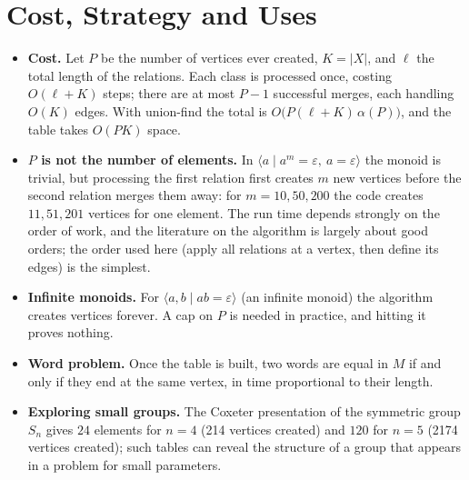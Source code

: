 \documentclass[11pt]{article}
\begin{document}
\section{Cost, Strategy and Uses}
\begin{itemize}[leftmargin=1.5em]
  \item \textbf{Cost.} Let $P$ be the number of vertices ever created, $K=|X|$, and $\ell$ the total length of the relations. Each class is processed once, costing $O(\ell+K)$ steps; there are at most $P-1$ successful merges, each handling $O(K)$ edges.
        With union-find the total is $O\bigl(P(\ell+K)\,\alpha(P)\bigr)$, and the table takes $O(PK)$ space.
  \item \textbf{$P$ is not the number of elements.} In $\langle a\mid a^m=\varepsilon,\ a=\varepsilon\rangle$ the monoid is trivial, but processing the first relation first creates $m$ new vertices before the second relation merges them away: for $m=10,50,200$ the code creates $11,51,201$ vertices for one element.
        The run time depends strongly on the order of work, and the literature on the algorithm is largely about good orders; the order used here (apply all relations at a vertex, then define its edges) is the simplest.
  \item \textbf{Infinite monoids.} For $\langle a,b\mid ab=\varepsilon\rangle$ (an infinite monoid) the algorithm creates vertices forever. A cap on $P$ is needed in practice, and hitting it proves nothing.
  \item \textbf{Word problem.} Once the table is built, two words are equal in $M$ if and only if they end at the same vertex, in time proportional to their length.
  \item \textbf{Exploring small groups.} The Coxeter presentation of the symmetric group $S_n$ gives $24$ elements for $n=4$ (214 vertices created) and $120$ for $n=5$ (2174 vertices created); such tables can reveal the structure of a group that appears in a problem for small parameters.
\end{itemize}
\end{document}
